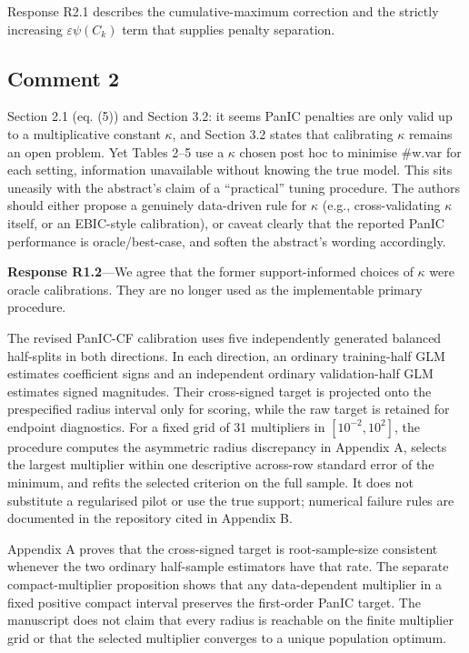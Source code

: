 \documentclass[11pt]{article}
\newcommand{\response}[1]{\par\noindent\textbf{Response #1}---}
\begin{document}
Response R2.1 describes the cumulative-maximum correction and the strictly increasing $\varepsilon\psi(C_k)$ term that supplies penalty separation.

\subsection*{Comment 2}
Section 2.1 (eq. (5)) and Section 3.2: it seems PanIC penalties are only valid up to a multiplicative constant $\kappa$, and Section 3.2 states that calibrating $\kappa$ remains an open problem. Yet Tables 2--5 use a $\kappa$ chosen post hoc to minimise \#w.var for each setting, information unavailable without knowing the true model. This sits uneasily with the abstract's claim of a ``practical'' tuning procedure. The authors should either propose a genuinely data-driven rule for $\kappa$ (e.g., cross-validating $\kappa$ itself, or an EBIC-style calibration), or caveat clearly that the reported PanIC performance is oracle/best-case, and soften the abstract's wording accordingly.

\response{R1.2}We agree that the former support-informed choices of $\kappa$ were oracle calibrations. They are no longer used as the implementable primary procedure.

The revised PanIC-CF calibration uses five independently generated balanced half-splits in both directions. In each direction, an ordinary training-half GLM estimates coefficient signs and an independent ordinary validation-half GLM estimates signed magnitudes. Their cross-signed target is projected onto the prespecified radius interval only for scoring, while the raw target is retained for endpoint diagnostics. For a fixed grid of 31 multipliers in $[10^{-2},10^2]$, the procedure computes the asymmetric radius discrepancy in Appendix A, selects the largest multiplier within one descriptive across-row standard error of the minimum, and refits the selected criterion on the full sample. It does not substitute a regularised pilot or use the true support; numerical failure rules are documented in the repository cited in Appendix B.

Appendix A proves that the cross-signed target is root-sample-size consistent whenever the two ordinary half-sample estimators have that rate. The separate compact-multiplier proposition shows that any data-dependent multiplier in a fixed positive compact interval preserves the first-order PanIC target. The manuscript does not claim that every radius is reachable on the finite multiplier grid or that the selected multiplier converges to a unique population optimum.
\end{document}
